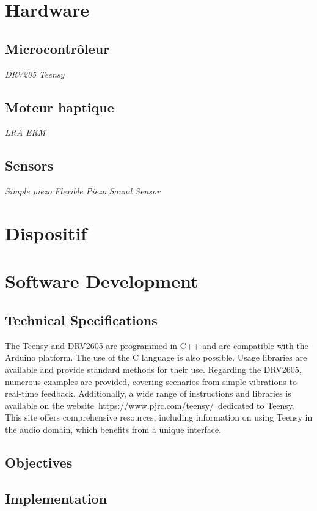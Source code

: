 \section{Hardware}
\subsection{Microcontrôleur}

\textit{DRV205}
\textit{Teensy}

\subsection{Moteur haptique}
\textit{LRA}
\textit{ERM}

\subsection{Sensors}
\textit{Simple piezo}
\textit{Flexible Piezo}
\textit{Sound Sensor}

\section{Dispositif }

\section{Software Development }
\subsection{Technical Specifications}

The Teensy and DRV2605 are programmed in C++ and are compatible with the Arduino platform. The use of the C language is also possible. Usage libraries are available and provide standard methods for their use. Regarding the DRV2605, numerous examples are provided, covering scenarios from simple vibrations to real-time feedback. Additionally, a wide range of instructions and libraries is available on the website https://www.pjrc.com/teensy/ dedicated to Teensy. This site offers comprehensive resources, including information on using Teensy in the audio domain, which benefits from a unique interface.
 
\subsection{Objectives}

\subsection{Implementation}


